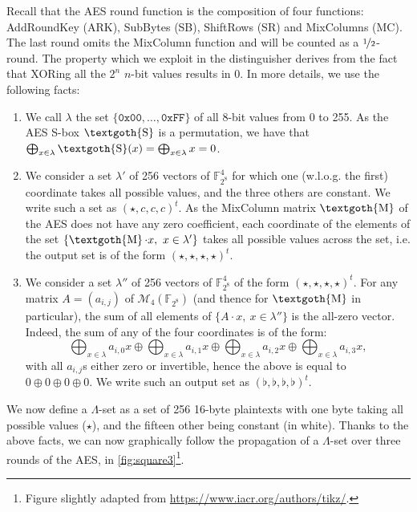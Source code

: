 \documentclass[a4paper,11pt]{article}
\DeclareMathOperator\sub{\textgoth{S}}
\DeclareMathOperator\mc{\textgoth{M}}
\begin{document}
Recall that the AES round function is the composition of four functions: AddRoundKey (ARK), SubBytes (SB), ShiftRows (SR) and MixColumns (MC).
The last round omits the
MixColumn function and will be counted as a $\nicefrac{1}{2}$-round.
The property which we exploit in the distinguisher derives from the fact that XORing all the $2^n$ $n$-bit values results in $0$. 
In more details, we use the following facts:
\begin{enumerate}
\item We call $\lambda$ the set $\{\texttt{0x00}, \ldots, \texttt{0xFF}\}$ of all 8-bit values from 0 to 255.
As the AES S-box $\sub$ is a permutation, we have that $\bigoplus_{x \in \lambda} \sub(x) = \bigoplus_{x \in \lambda} x = 0$.
\item We consider a set $\lambda'$ of 256 vectors of $\mathbb{F}_{2^8}^4$ for which one (w.l.o.g. the first) coordinate takes all possible values,
and the three others are constant. We write such a set as $(\star, c, c, c)^t$. As the MixColumn matrix $\mc$ of the AES
does not have any zero coefficient, each coordinate of the elements of the set $\{\mc\cdot x,~x \in \lambda'\}$ takes all possible values
across the set, i.e. the output set is of the form $(\star, \star, \star, \star)^t$.
\item We consider a set $\lambda''$ of 256 vectors of $\mathbb{F}_{2^8}^4$ of the form $(\star, \star, \star, \star)^t$. For any matrix
$A = (a_{i,j})$ of $\mathcal{M}_{4}(\mathbb{F}_{2^8})$ (and thence for $\mc$ in particular), the sum of all elements of $\{A\cdot x,~x \in \lambda''\}$
is the all-zero vector. Indeed, the sum of any of the four coordinates is of the form:
\[
\bigoplus_{x \in \lambda} a_{i,0} x \oplus \bigoplus_{x \in \lambda} a_{i,1} x \oplus \bigoplus_{x \in \lambda} a_{i,2} x \oplus \bigoplus_{x \in \lambda} a_{i,3} x,
\]
with all $a_{i,j}$s either zero or invertible, hence the above is equal to $0 \oplus 0 \oplus 0 \oplus 0$. We write such an output set as $(\flat, \flat, \flat, \flat)^t$.
\end{enumerate}

We now define a $\Lambda$-set as a set of 256 16-byte plaintexts with one byte taking all possible values ($\star$), and the fifteen other being constant (in white).
Thanks to the above facts, we can now graphically follow the propagation of a $\Lambda$-set over three rounds of the AES, in \autoref{fig:square3}\footnote{Figure slightly adapted from \href{https://www.iacr.org/authors/tikz/}{https://www.iacr.org/authors/tikz/}.}.
\end{document}
